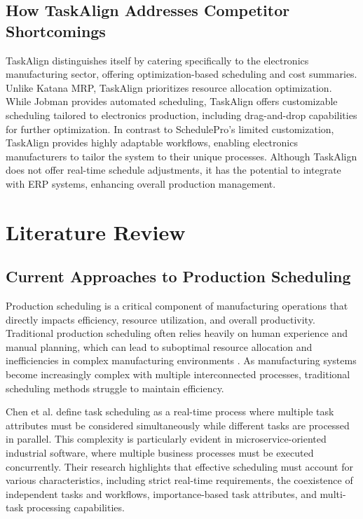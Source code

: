 \subsection{How TaskAlign Addresses Competitor Shortcomings}
TaskAlign distinguishes itself by catering specifically to the electronics manufacturing sector, offering optimization-based scheduling and cost summaries. Unlike Katana MRP, TaskAlign prioritizes resource allocation optimization. While Jobman provides automated scheduling, TaskAlign offers customizable scheduling tailored to electronics production, including drag-and-drop capabilities for further optimization. In contrast to SchedulePro's limited customization, TaskAlign provides highly adaptable workflows, enabling electronics manufacturers to tailor the system to their unique processes. Although TaskAlign does not offer real-time schedule adjustments, it has the potential to integrate with ERP systems, enhancing overall production management.


\section{Literature Review}
\label{section:literature-review}


\subsection{Current Approaches to Production Scheduling}

Production scheduling is a critical component of manufacturing operations that directly impacts efficiency, resource utilization, and overall productivity. Traditional production scheduling often relies heavily on human experience and manual planning, which can lead to suboptimal resource allocation and inefficiencies in complex manufacturing environments \cite{alander2024}. As manufacturing systems become increasingly complex with multiple interconnected processes, traditional scheduling methods struggle to maintain efficiency.

Chen et al. \cite{chen2023} define task scheduling as a real-time process where multiple task attributes must be considered simultaneously while different tasks are processed in parallel. This complexity is particularly evident in microservice-oriented industrial software, where multiple business processes must be executed concurrently. Their research highlights that effective scheduling must account for various characteristics, including strict real-time requirements, the coexistence of independent tasks and workflows, importance-based task attributes, and multi-task processing capabilities.

